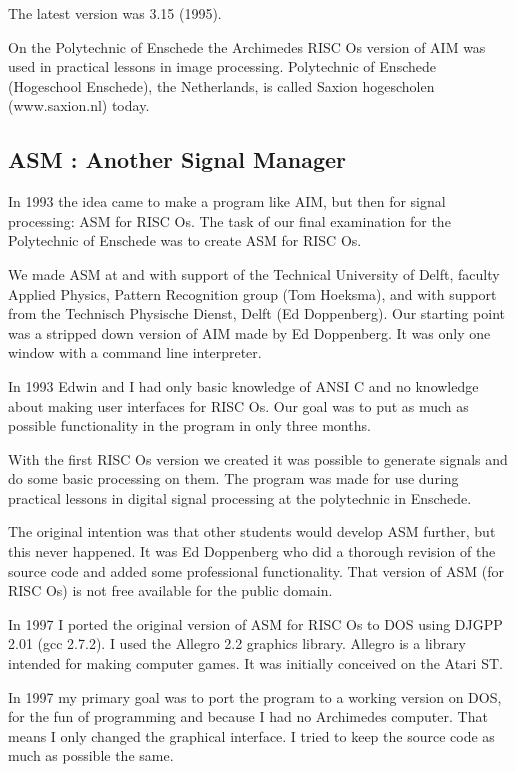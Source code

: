 \documentclass{report}
\begin{document}
The latest version was 3.15 (1995).

On the Polytechnic of Enschede the Archimedes RISC Os version of AIM was used
in practical lessons in image processing.  Polytechnic of Enschede (Hogeschool
Enschede), the Netherlands, is called Saxion hogescholen (www.saxion.nl)
today.


\subsection{ASM : Another Signal Manager}

In 1993 the idea came to make a program like AIM, but then for signal
processing: ASM for RISC Os.  The task of our final examination for the
Polytechnic of Enschede was to create ASM for RISC Os.

We made ASM at and with support of the Technical University of Delft, faculty
Applied Physics, Pattern Recognition group (Tom Hoeksma), and with support from
the Technisch Physische Dienst, Delft (Ed Doppenberg).  Our starting point was
a stripped down version of AIM made by Ed Doppenberg.  It was only one window
with a command line interpreter. 

In 1993 Edwin and I had only basic knowledge of ANSI C and no knowledge about
making user interfaces for RISC Os. Our goal was to put as much as possible
functionality in the program in only three months.

With the first RISC Os version we created it was possible to generate signals
and do some basic processing on them. The program was made for use during
practical lessons in digital signal processing at the polytechnic in Enschede.

The original intention was that other students would develop ASM further, but
this never happened. It was Ed Doppenberg who did a thorough revision of the
source code and added some professional functionality. That version of ASM (for
RISC Os) is not free available for the public domain.

In 1997 I ported the original version of ASM for RISC Os to DOS using DJGPP
2.01 (gcc 2.7.2). I used the Allegro 2.2 graphics library.  Allegro is a
library intended for making computer games. It was initially conceived on the
Atari ST.

In 1997 my primary goal was to port the program to a working version on DOS, for
the fun of programming and because I had no Archimedes computer.  That means I
only changed the graphical interface. I tried to keep the source code as much
as possible the same.
\end{document}
